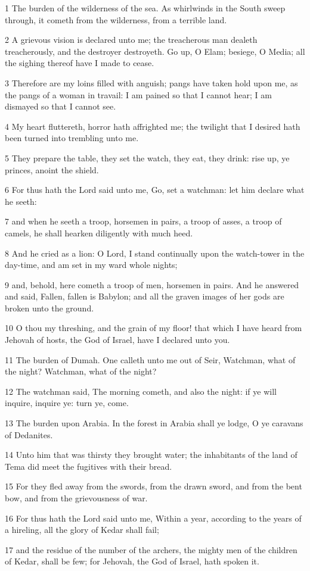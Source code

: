 \par 1 The burden of the wilderness of the sea. As whirlwinds in the South sweep through, it cometh from the wilderness, from a terrible land.
\par 2 A grievous vision is declared unto me; the treacherous man dealeth treacherously, and the destroyer destroyeth. Go up, O Elam; besiege, O Media; all the sighing thereof have I made to cease.
\par 3 Therefore are my loins filled with anguish; pangs have taken hold upon me, as the pangs of a woman in travail: I am pained so that I cannot hear; I am dismayed so that I cannot see.
\par 4 My heart fluttereth, horror hath affrighted me; the twilight that I desired hath been turned into trembling unto me.
\par 5 They prepare the table, they set the watch, they eat, they drink: rise up, ye princes, anoint the shield.
\par 6 For thus hath the Lord said unto me, Go, set a watchman: let him declare what he seeth:
\par 7 and when he seeth a troop, horsemen in pairs, a troop of asses, a troop of camels, he shall hearken diligently with much heed.
\par 8 And he cried as a lion: O Lord, I stand continually upon the watch-tower in the day-time, and am set in my ward whole nights;
\par 9 and, behold, here cometh a troop of men, horsemen in pairs. And he answered and said, Fallen, fallen is Babylon; and all the graven images of her gods are broken unto the ground.
\par 10 O thou my threshing, and the grain of my floor! that which I have heard from Jehovah of hosts, the God of Israel, have I declared unto you.
\par 11 The burden of Dumah. One calleth unto me out of Seir, Watchman, what of the night? Watchman, what of the night?
\par 12 The watchman said, The morning cometh, and also the night: if ye will inquire, inquire ye: turn ye, come.
\par 13 The burden upon Arabia. In the forest in Arabia shall ye lodge, O ye caravans of Dedanites.
\par 14 Unto him that was thirsty they brought water; the inhabitants of the land of Tema did meet the fugitives with their bread.
\par 15 For they fled away from the swords, from the drawn sword, and from the bent bow, and from the grievousness of war.
\par 16 For thus hath the Lord said unto me, Within a year, according to the years of a hireling, all the glory of Kedar shall fail;
\par 17 and the residue of the number of the archers, the mighty men of the children of Kedar, shall be few; for Jehovah, the God of Israel, hath spoken it.

